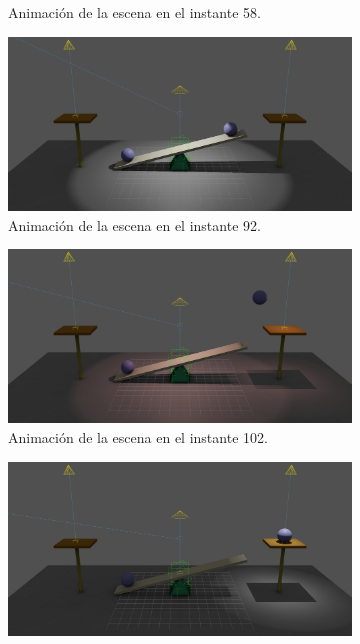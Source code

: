 \begin{figure}[H]
\begin{subfigure}[t]{0.48\textwidth}
    \caption{Animación de la escena en el instante 58.}
 \end{subfigure}
\hfill
 \begin{subfigure}[t]{0.48\textwidth}
    \centering
    \includegraphics[width=\textwidth]{imagenes/animaciones/general/92.jpg}
    \caption{Animación de la escena en el instante 92.}
 \end{subfigure}
\hfill
 \begin{subfigure}[t]{0.48\textwidth}
    \centering
    \includegraphics[width=\textwidth]{imagenes/animaciones/general/102.jpg}
    \caption{Animación de la escena en el instante 102.}
 \end{subfigure}
\hfill
 \begin{subfigure}[t]{0.48\textwidth}
    \centering
    \includegraphics[width=\textwidth]{imagenes/animaciones/general/112.jpg}

\end{subfigure}
\end{figure}
